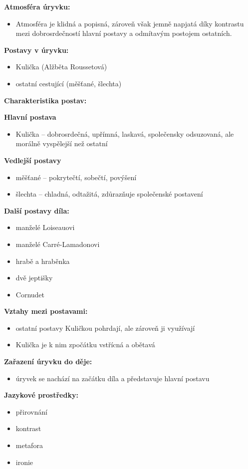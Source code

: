 \documentclass[12pt,a4paper]{article}
\begin{document}
\begin{tcolorbox}[breakable]

\textbf{Atmosféra úryvku:}
\begin{itemize}
\item Atmosféra je klidná a popisná, zároveň však jemně napjatá díky kontrastu mezi dobrosrdečností hlavní postavy a odmítavým postojem ostatních.
\end{itemize}

\textbf{Postavy v úryvku:}
\begin{itemize}
\item Kulička (Alžběta Roussetová)
\item ostatní cestující (měšťané, šlechta)
\end{itemize}

\textbf{Charakteristika postav:}

\textbf{Hlavní postava}
\begin{itemize}
\item Kulička – dobrosrdečná, upřímná, laskavá, společensky odsuzovaná, ale morálně vyspělejší než ostatní
\end{itemize}

\textbf{Vedlejší postavy}
\begin{itemize}
\item měšťané – pokrytečtí, sobečtí, povýšení
\item šlechta – chladná, odtažitá, zdůrazňuje společenské postavení
\end{itemize}

\textbf{Další postavy díla:}
\begin{itemize}
\item manželé Loiseauovi
\item manželé Carré-Lamadonovi
\item hrabě a hraběnka
\item dvě jeptišky
\item Cornudet
\end{itemize}

\textbf{Vztahy mezi postavami:}
\begin{itemize}
\item ostatní postavy Kuličkou pohrdají, ale zároveň ji využívají
\item Kulička je k nim zpočátku vstřícná a obětavá
\end{itemize}

\textbf{Zařazení úryvku do děje:}
\begin{itemize}
\item úryvek se nachází na začátku díla a představuje hlavní postavu
\end{itemize}

\textbf{Jazykové prostředky:}
\begin{itemize}
\item přirovnání
\item kontrast
\item metafora
\item ironie
\end{itemize}

\end{tcolorbox}
\end{document}
